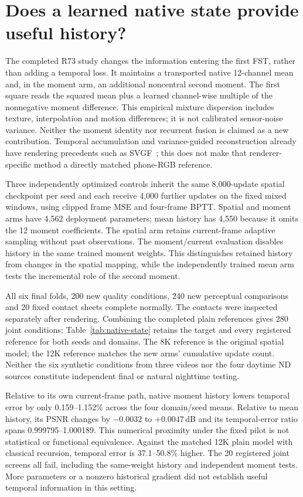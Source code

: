 \section{Does a learned native state provide useful history?}
\label{sec:native-state}
The completed R73 study changes the information entering the first FST,
rather than adding a temporal loss. It maintains a transported native
12-channel mean and, in the moment arm, an additional noncentral second
moment. The first square reads the squared mean plus a learned
channel-wise multiple of the nonnegative moment difference. This
empirical mixture dispersion includes texture, interpolation and motion
differences; it is not calibrated sensor-noise variance. Neither the
moment identity nor recurrent fusion is claimed as a new contribution.
Temporal accumulation and variance-guided reconstruction already have
rendering precedents such as SVGF~\cite{svgf}; this does not make that
renderer-specific method a directly matched phone-RGB reference.

Three independently optimized controls inherit the same 8,000-update
spatial checkpoint per seed and each receive 4,000 further updates on
the fixed mixed windows, using clipped frame MSE and four-frame BPTT.
Spatial and moment arms have 4,562 deployment parameters; mean history
has 4,550 because it omits the 12 moment coefficients. The spatial arm
retains current-frame adaptive sampling without past observations.
The moment/current evaluation disables history in the same trained
moment weights. This distinguishes retained history from changes in the
spatial mapping, while the independently trained mean arm tests the
incremental role of the second moment.


All six final folds, 200 new quality conditions, 240 new perceptual
comparisons and 20 fixed contact sheets complete normally. The contacts
were inspected separately after rendering. Combining the completed
plain references gives 280 joint conditions; Table~\ref{tab:native-state}
retains the target and every registered reference for both seeds and
domains. The 8K reference is the original spatial model; the 12K reference
matches the new arms' cumulative update count. Neither the six synthetic
conditions from three videos nor the four daytime ND sources constitute
independent final or natural nighttime testing.

Relative to its own current-frame path, native moment history lowers
temporal error by only 0.159--1.152\% across the four domain/seed means.
Relative to mean history, its PSNR changes by $-0.0032$ to $+0.0047$\,dB
and its temporal-error ratio spans 0.999795--1.000189. This numerical
proximity under the fixed pilot is not statistical or functional
equivalence. Against the matched 12K plain model with classical
recursion, temporal error is 37.1--50.8\% higher. The 20 registered joint
screens all fail, including the same-weight history and independent
moment tests. More parameters or a nonzero historical gradient did not
establish useful temporal information in this setting.

